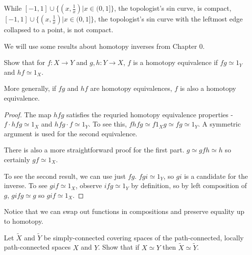 \documentclass[10pt]{article}
\begin{document}
\begin{note}
	While $[-1, 1] \cup \{ (x, \frac{1}{x}) | x \in (0, 1] \}$, the topologist's
	sin curve, is compact, $[-1, 1] \cup \{ (x, \frac{1}{x}) | x \in (0, 1] \}$,
	the topologist's sin curve with the leftmost edge collapsed to a point, is
	not compact.
\end{note}

We will use some results about homotopy inverses from Chapter 0.

\begin{exercise}
	Show that for $f: X \to Y$ and $g, h: Y \to X$, $f$ is a homotopy equivalence if $fg
	\simeq 1_Y$ and $hf \simeq 1_X$.

	More generally, if $fg$ and $hf$ are homotopy equivalences, $f$ is also a
	homotopy equivalence.
\end{exercise}

\begin{proof}
	The map $hfg$ satisfies the requried homotopy equivalence properties - $f \cdot hfg
	\simeq 1_X$ and  $hfg \cdot f \simeq 1_Y$. To see this, $fhfg \simeq f1_Xg
	\simeq fg \simeq 1_Y$. A symmetric argument is used for the second
	equivalence.

	There is also a more straightforward proof for the first part. $g \simeq gfh \simeq h$ so certainly
	$gf \simeq 1_X$.

	To see the second result, we can use just $fg$. $fgi \simeq 1_Y$, so $gi$ is
	a candidate for the inverse. To see $gif \simeq 1_X$, observe $ifg \simeq
	1_Y$ by definition, so by left composition of $g$, $gifg \simeq g$ so $gif
	\simeq 1_X$.
\end{proof}

Notice that we can swap out functions in compositions and preserve
equality up to homotopy.

\begin{exercise}
	Let $\tilde{X}$ and $\tilde{Y}$ be simply-connected covering spaces of the
	path-connected, locally path-connected spaces $X$ and $Y$. Show that if
	$X \simeq Y$ then $\tilde{X} \simeq \tilde{Y}$.
\end{exercise}
\end{document}
